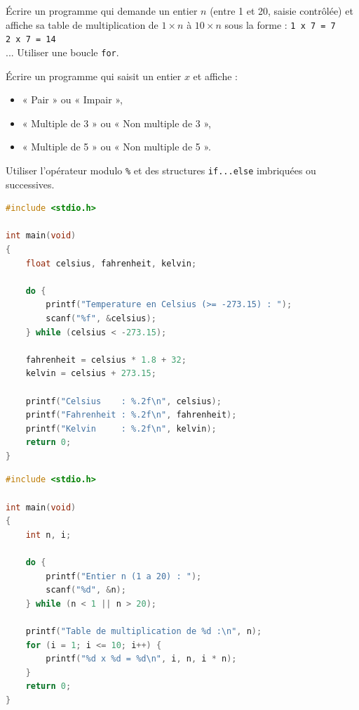 \documentclass[11pt]{article}
\begin{document}
\begin{exercice}
Écrire un programme qui demande un entier $n$ (entre 1 et 20, saisie contrôlée) et affiche sa table de multiplication de $1 \times n$ à $10 \times n$ sous la forme :
\texttt{1 x 7 = 7} \\
\texttt{2 x 7 = 14} \\
...
Utiliser une boucle \texttt{for}.
\end{exercice}

\begin{exercice}
Écrire un programme qui saisit un entier $x$ et affiche :
\begin{itemize}
\item « Pair » ou « Impair »,
\item « Multiple de 3 » ou « Non multiple de 3 »,
\item « Multiple de 5 » ou « Non multiple de 5 ».
\end{itemize}
Utiliser l'opérateur modulo \texttt{\%} et des structures \texttt{if...else} imbriquées ou successives.
\end{exercice}

\begin{corrige}
\begin{lstlisting}[language=C]
#include <stdio.h>

int main(void)
{
    float celsius, fahrenheit, kelvin;

    do {
        printf("Temperature en Celsius (>= -273.15) : ");
        scanf("%f", &celsius);
    } while (celsius < -273.15);

    fahrenheit = celsius * 1.8 + 32;
    kelvin = celsius + 273.15;

    printf("Celsius    : %.2f\n", celsius);
    printf("Fahrenheit : %.2f\n", fahrenheit);
    printf("Kelvin     : %.2f\n", kelvin);
    return 0;
}
\end{lstlisting}
\end{corrige}

\begin{corrige}
\begin{lstlisting}[language=C]
#include <stdio.h>

int main(void)
{
    int n, i;

    do {
        printf("Entier n (1 a 20) : ");
        scanf("%d", &n);
    } while (n < 1 || n > 20);

    printf("Table de multiplication de %d :\n", n);
    for (i = 1; i <= 10; i++) {
        printf("%d x %d = %d\n", i, n, i * n);
    }
    return 0;
}
\end{lstlisting}
\end{corrige}
\end{document}
